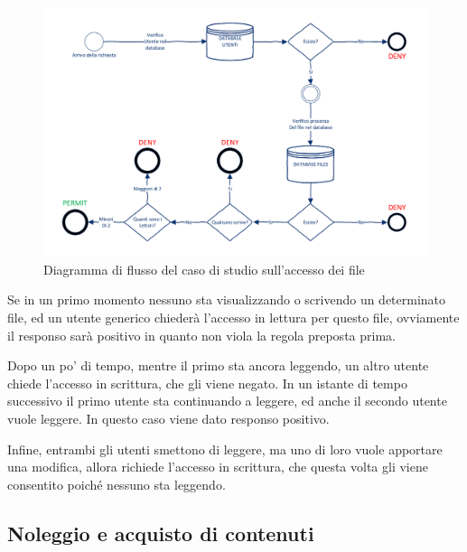 \begin{figure}[h]
	\centering 
	\includegraphics[width = 1.0\textwidth]{./Visio_Project/DiagrammaFlussoPrimoEsempio.pdf}
 	\caption{Diagramma di flusso del caso di studio sull'accesso dei file}
 	\label{fig:diagrammaflussoprimoesempio}
\end{figure}

Se in un primo momento nessuno sta visualizzando o scrivendo un determinato file, ed un utente generico 
chiederà l'accesso in lettura per questo file, ovviamente il responso sarà positivo in quanto non viola la regola preposta prima.\par
Dopo un po' di tempo, mentre il primo sta ancora leggendo, un altro utente chiede l'accesso in scrittura, che gli viene negato.
In un istante di tempo successivo il primo utente sta continuando a leggere, ed anche il secondo utente vuole leggere. In questo caso viene dato responso positivo.\par
Infine, entrambi gli utenti smettono di leggere, ma uno di loro vuole apportare una modifica, allora richiede l'accesso in scrittura, che questa volta gli viene consentito poiché nessuno sta leggendo.



\subsection{Noleggio e acquisto di contenuti}
\label{sub:case2}

